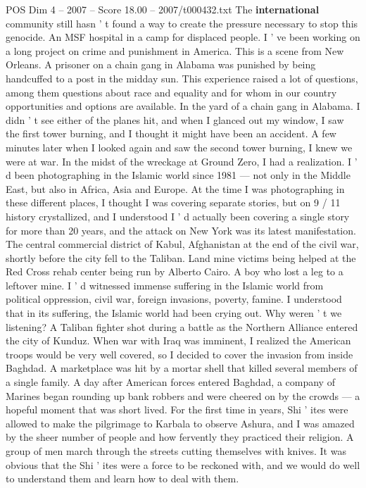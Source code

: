 \begin{textsample}{POS Dim 4 – 2007 – Score 18.00 – 2007/t000432.txt}
The \textbf{international} community still hasn ' t found a way to create the pressure necessary to stop this genocide.
An MSF hospital in a camp for displaced people.
I ' ve been working on a long project on crime and punishment in America.
This is a scene from New Orleans.
A prisoner on a chain gang in Alabama was punished by being handcuffed to a post in the midday sun.
This experience raised a lot of questions, among them questions about race and equality and for whom in our country opportunities and options are available.
In the yard of a chain gang in Alabama.
I didn ' t see either of the planes hit, and when I glanced out my window, I saw the first tower burning, and I thought it might have been an accident.
A few minutes later when I looked again and saw the second tower burning, I knew we were at war.
In the midst of the wreckage at Ground Zero, I had a realization.
I ' d been photographing in the Islamic world since 1981 — not only in the Middle East, but also in Africa, Asia and Europe.
At the time I was photographing in these different places, I thought I was covering separate stories, but on 9 / 11 history crystallized, and I understood I ' d actually been covering a single story for more than 20 years, and the attack on New York was its latest manifestation.
The central commercial district of Kabul, Afghanistan at the end of the civil war, shortly before the city fell to the Taliban.
Land mine victims being helped at the Red Cross rehab center being run by Alberto Cairo.
A boy who lost a leg to a leftover mine.
I ' d witnessed immense suffering in the Islamic world from political oppression, civil war, foreign invasions, poverty, famine.
I understood that in its suffering, the Islamic world had been crying out.
Why weren ' t we listening?
A Taliban fighter shot during a battle as the Northern Alliance entered the city of Kunduz.
When war with Iraq was imminent, I realized the American troops would be very well covered, so I decided to cover the invasion from inside Baghdad.
A marketplace was hit by a mortar shell that killed several members of a single family.
A day after American forces entered Baghdad, a company of Marines began rounding up bank robbers and were cheered on by the crowds — a hopeful moment that was short lived.
For the first time in years, Shi ' ites were allowed to make the pilgrimage to Karbala to observe Ashura, and I was amazed by the sheer number of people and how fervently they practiced their religion.
A group of men march through the streets cutting themselves with knives.
It was obvious that the Shi ' ites were a force to be reckoned with, and we would do well to understand them and learn how to deal with them.

\end{textsample}
